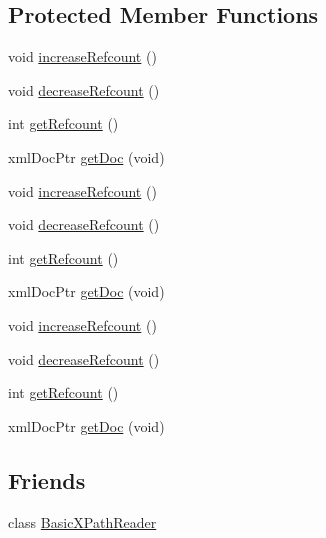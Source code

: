 \subsection*{Protected Member Functions}
\begin{DoxyCompactItemize}
\item 
void \mbox{\hyperlink{classXMLXPathReader_1_1XMLDocument_ac39670aea17809a726dc6a2cc91c9710}{increase\+Refcount}} ()
\item 
void \mbox{\hyperlink{classXMLXPathReader_1_1XMLDocument_af1e14d662e9ebf8ce5288d5c77ca4ac6}{decrease\+Refcount}} ()
\item 
int \mbox{\hyperlink{classXMLXPathReader_1_1XMLDocument_af2b6cf36ebceab808e4856d3e7a20921}{get\+Refcount}} ()
\item 
xml\+Doc\+Ptr \mbox{\hyperlink{classXMLXPathReader_1_1XMLDocument_aa4fceaafd3c764004b6da33a26acc16d}{get\+Doc}} (void)
\item 
void \mbox{\hyperlink{classXMLXPathReader_1_1XMLDocument_ac39670aea17809a726dc6a2cc91c9710}{increase\+Refcount}} ()
\item 
void \mbox{\hyperlink{classXMLXPathReader_1_1XMLDocument_af1e14d662e9ebf8ce5288d5c77ca4ac6}{decrease\+Refcount}} ()
\item 
int \mbox{\hyperlink{classXMLXPathReader_1_1XMLDocument_af2b6cf36ebceab808e4856d3e7a20921}{get\+Refcount}} ()
\item 
xml\+Doc\+Ptr \mbox{\hyperlink{classXMLXPathReader_1_1XMLDocument_aa4fceaafd3c764004b6da33a26acc16d}{get\+Doc}} (void)
\item 
void \mbox{\hyperlink{classXMLXPathReader_1_1XMLDocument_ac39670aea17809a726dc6a2cc91c9710}{increase\+Refcount}} ()
\item 
void \mbox{\hyperlink{classXMLXPathReader_1_1XMLDocument_af1e14d662e9ebf8ce5288d5c77ca4ac6}{decrease\+Refcount}} ()
\item 
int \mbox{\hyperlink{classXMLXPathReader_1_1XMLDocument_af2b6cf36ebceab808e4856d3e7a20921}{get\+Refcount}} ()
\item 
xml\+Doc\+Ptr \mbox{\hyperlink{classXMLXPathReader_1_1XMLDocument_aa4fceaafd3c764004b6da33a26acc16d}{get\+Doc}} (void)
\end{DoxyCompactItemize}
\subsection*{Friends}
\begin{DoxyCompactItemize}
\item 
class \mbox{\hyperlink{classXMLXPathReader_1_1XMLDocument_aab456070fa37ace014ac68d8cfd00c68}{Basic\+X\+Path\+Reader}}
\end{DoxyCompactItemize}


